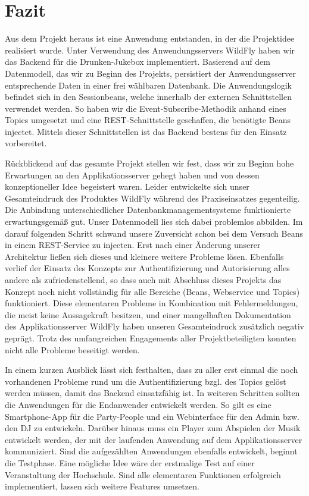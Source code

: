 \newpage
\section{Fazit}
Aus dem Projekt heraus ist eine Anwendung entstanden, in der die Projektidee realisiert wurde. Unter Verwendung des Anwendungsservers WildFly haben wir das Backend für die Drunken-Jukebox implementiert.
Basierend auf dem Datenmodell, das wir zu Beginn des Projekts, persistiert der Anwendungsserver entsprechende Daten in einer frei wählbaren Datenbank. Die Anwendungslogik befindet sich in den Sessionbeans, welche innerhalb der externen Schnittstellen verwendet werden. So haben wir die Event-Subscribe-Methodik anhand eines Topics umgesetzt und eine REST-Schnittstelle geschaffen, die benötigte Beans injectet. Mittels dieser Schnittstellen ist das Backend bestens für den Einsatz vorbereitet. 

Rückblickend auf das gesamte Projekt stellen wir fest, dass wir zu Beginn hohe Erwartungen an den Applikationsserver gehegt haben und von dessen konzeptioneller Idee begeistert waren. Leider entwickelte sich unser Gesamteindruck des Produktes WildFly während des Praxiseinsatzes gegenteilig. 
Die Anbindung unterschiedlicher Datenbankmanagementsysteme funktionierte erwartungsgemäß gut. Unser Datenmodell lies sich dabei problemlos abbilden. Im darauf folgenden Schritt schwand unsere Zuversicht schon bei dem Versuch Beans in einem REST-Service zu injecten. Erst nach einer Änderung unserer Architektur ließen sich dieses und kleinere weitere Probleme lösen. Ebenfalls verlief der Einsatz des Konzepts zur Authentifizierung und Autorisierung alles andere als zufriedenstellend, so dass auch mit Abschluss dieses Projekts das Konzept noch nicht vollständig für alle Bereiche (Beans, Webservice und Topics) funktioniert.
Diese elementaren Probleme in Kombination mit Fehlermeldungen, die meist keine Aussagekraft besitzen, und einer mangelhaften Dokumentation des Applikationsserver WildFly haben unseren Gesamteindruck zusätzlich negativ geprägt. Trotz des umfangreichen Engagements aller Projektbeteiligten konnten nicht alle Probleme beseitigt werden.

In einem kurzen Ausblick lässt sich festhalten, dass zu aller erst einmal die noch vorhandenen Probleme rund um die Authentifizierung bzgl. des Topics gelöst werden müssen, damit das Backend einsatzfähig ist. In weiteren Schritten sollten die Anwendungen für die Endanwender entwickelt werden. So gilt es eine Smartphone-App für die Party-People und ein Webinterface für den Admin bzw. den DJ zu entwickeln. Darüber hinaus muss ein Player zum Abspielen der Musik entwickelt werden, der mit der laufenden Anwendung auf dem Applikationsserver kommuniziert.
Sind die aufgezählten Anwendungen ebenfalls entwickelt, beginnt die Testphase. Eine mögliche Idee wäre der erstmalige Test auf einer Veranstaltung der Hochschule. Sind alle elementaren Funktionen erfolgreich implementiert, lassen sich weitere Features umsetzen.